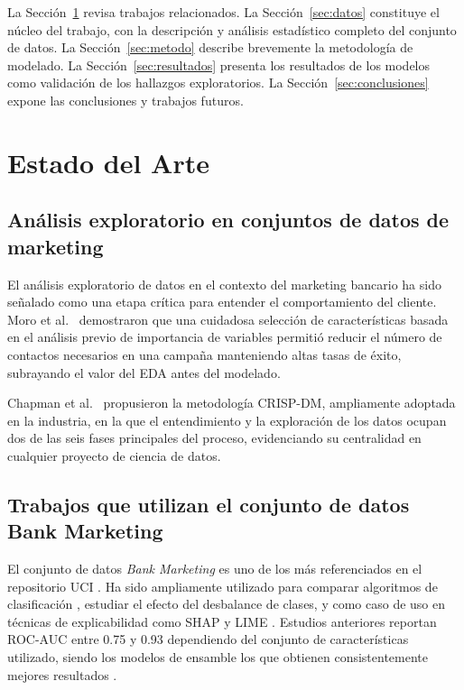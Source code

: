 \documentclass[conference]{IEEEtran}
\begin{document}
La Sección~\ref{sec:arte} revisa trabajos relacionados. La Sección~\ref{sec:datos} constituye el núcleo del trabajo, con la descripción y análisis estadístico completo del conjunto de datos. La Sección~\ref{sec:metodo} describe brevemente la metodología de modelado. La Sección~\ref{sec:resultados} presenta los resultados de los modelos como validación de los hallazgos exploratorios. La Sección~\ref{sec:conclusiones} expone las conclusiones y trabajos futuros.

\section{Estado del Arte}
\label{sec:arte}

\subsection{Análisis exploratorio en conjuntos de datos de marketing}

El análisis exploratorio de datos en el contexto del marketing bancario ha sido señalado como una etapa crítica para entender el comportamiento del cliente. Moro et al.\ \cite{moro2014} demostraron que una cuidadosa selección de características basada en el análisis previo de importancia de variables permitió reducir el número de contactos necesarios en una campaña manteniendo altas tasas de éxito, subrayando el valor del EDA antes del modelado.

Chapman et al.\ \cite{crisp2000} propusieron la metodología CRISP-DM, ampliamente adoptada en la industria, en la que el entendimiento y la exploración de los datos ocupan dos de las seis fases principales del proceso, evidenciando su centralidad en cualquier proyecto de ciencia de datos.

\subsection{Trabajos que utilizan el conjunto de datos Bank Marketing}

El conjunto de datos \textit{Bank Marketing} es uno de los más referenciados en el repositorio UCI \cite{uci_bank}. Ha sido ampliamente utilizado para comparar algoritmos de clasificación \cite{bhatt2020}, estudiar el efecto del desbalance de clases, y como caso de uso en técnicas de explicabilidad como SHAP y LIME \cite{molnar2020}. Estudios anteriores reportan ROC-AUC entre 0.75 y 0.93 dependiendo del conjunto de características utilizado, siendo los modelos de ensamble los que obtienen consistentemente mejores resultados \cite{ferreira2020}.
\end{document}

